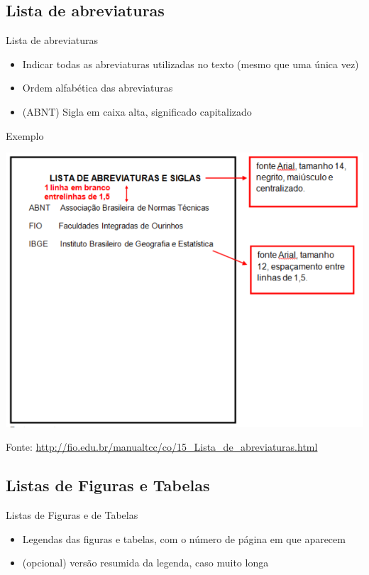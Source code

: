 \documentclass{beamer}
\begin{document}
\subsection{Lista de abreviaturas}

\begin{frame}{Lista de abreviaturas}
  \begin{itemize}
  \item Indicar \alert{todas} as abreviaturas utilizadas no texto
    (mesmo que uma única vez)
  \item Ordem alfabética das abreviaturas
  \item (ABNT) Sigla em caixa alta, significado capitalizado
  \end{itemize}
\end{frame}

\begin{frame}{Exemplo}
  \begin{center}
    \includegraphics[height=0.8\textheight]{ProjetoII/lista_abreviaturas}
  \end{center}

  Fonte: \url{http://fio.edu.br/manualtcc/co/15_Lista_de_abreviaturas.html}
\end{frame}

\subsection{Listas de Figuras e Tabelas}

\begin{frame}{Listas de Figuras e de Tabelas}
  \begin{itemize}
  \item Legendas das figuras e tabelas, com o número de página em que
    aparecem
  \item (opcional) versão resumida da legenda, caso muito longa
  \end{itemize}
\end{frame}
\end{document}
